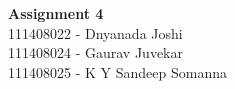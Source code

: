 \documentclass[main.tex]{subfiles}
\begin{document}
\begin{titlepage}

\begin{center}
  \LARGE{\bf{Assignment 4\\}}
  \horrule{0.4pt}
  111408022 - Dnyanada Joshi \\
  111408024 - Gaurav Juvekar \\
  111408025 - K Y Sandeep Somanna \\
\end{center}
\horrule{0.4pt}
\end{titlepage}
\end{document}
